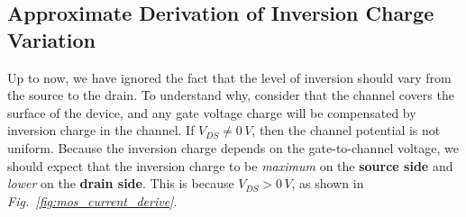 \subsection{Approximate Derivation of Inversion Charge Variation}
Up to now, we have ignored the fact that the level of inversion should vary from the source to the drain.  To understand why, consider that the channel covers the surface of the device, and any gate voltage charge will be compensated by inversion charge in the channel.  If $V_{DS} \ne 0\,V$, then the channel potential is not uniform. Because the inversion charge depends on the gate-to-channel voltage, we should expect that the inversion charge to be \textit{maximum} on the \textbf{source side} and \textit{lower} on the \textbf{drain side}.  This is because $V_{DS} > 0\,V$, as shown in \emph{Fig.~\ref{fig:mos_current_derive}}.

